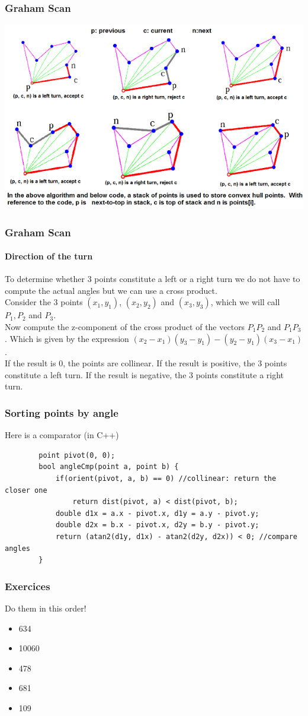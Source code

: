 \documentclass[pdf]{beamer}
\begin{document}
\begin{frame}
	\frametitle{Graham Scan}
	\includegraphics[width=1\textwidth]{graham}
\end{frame}

\begin{frame}
	\frametitle{Graham Scan}
	\framesubtitle{Direction of the turn}
	To determine whether 3 points constitute a left or a right turn we do not have to compute the actual angles but we can use a cross product.\\
	Consider the 3 points $(x_{1}, y_{1})$,  $(x_{2}, y_{2})$ and $(x_{3}, y_{3})$, which we will call $P_{1}, P_{2}$ and $P_{3}$.\\
	Now compute the z-component of the cross product of the vectors $P_{1}P_{2}$ and $P_{1}P_{3}$. Which is given by the expression $(x_{2}-x_{1})(y_{3}-y_{1})-(y_{2}-y_{1})(x_{3}-x_{1})$.\\
	If the result is 0, the points are collinear. If the result is positive, the 3 points constitute a left turn. If the result is negative, the 3 points constitute a right turn.
\end{frame}

\begin{frame}[fragile]
	\frametitle{Sorting points by angle}
	Here is a comparator (in C++)
	\begin{lstlisting}
		point pivot(0, 0);
		bool angleCmp(point a, point b) {
			if(orient(pivot, a, b) == 0) //collinear: return the closer one
				return dist(pivot, a) < dist(pivot, b);
			double d1x = a.x - pivot.x, d1y = a.y - pivot.y;
			double d2x = b.x - pivot.x, d2y = b.y - pivot.y;
			return (atan2(d1y, d1x) - atan2(d2y, d2x)) < 0; //compare angles
		}
	\end{lstlisting}
\end{frame}

\begin{frame}
	\frametitle{Exercices}
	Do them in this order!
	\begin{itemize}
		\item 634
		\item 10060
		\item 478
		\item 681
		\item 109
	\end{itemize}
\end{frame}
\end{document}
